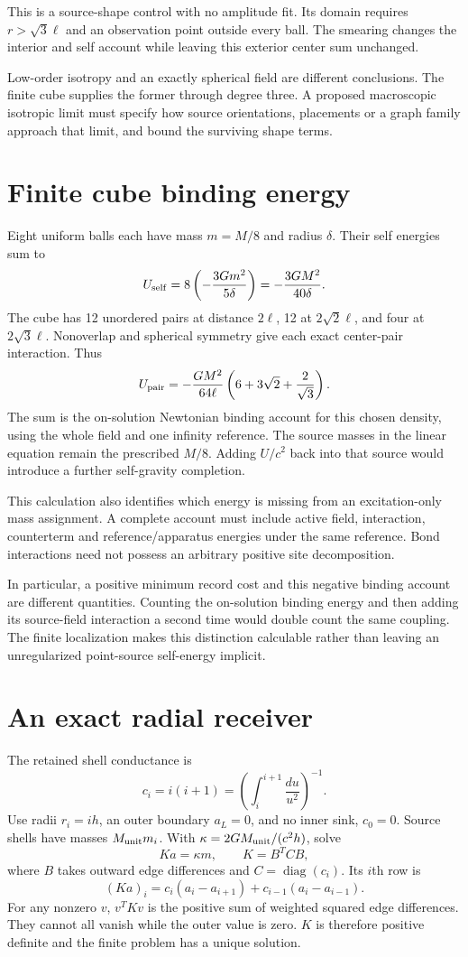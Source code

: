\documentclass[10pt,twocolumn,letterpaper]{article}
\begin{document}
This is a source-shape control with no amplitude fit. Its domain requires $r>\sqrt3\ell$ and an observation point outside every ball. The smearing changes the interior and self account while leaving this exterior center sum unchanged.

Low-order isotropy and an exactly spherical field are different conclusions. The finite cube supplies the former through degree three. A proposed macroscopic isotropic limit must specify how source orientations, placements or a graph family approach that limit, and bound the surviving shape terms.

\section{Finite cube binding energy}
Eight uniform balls each have mass $m=M/8$ and radius $\delta$. Their self energies sum to
\[
U_{\rm self}=8\left(-\frac{3Gm^2}{5\delta}\right)=-\frac{3GM^2}{40\delta}.
\]
The cube has 12 unordered pairs at distance $2\ell$, 12 at $2\sqrt2\ell$, and four at $2\sqrt3\ell$. Nonoverlap and spherical symmetry give each exact center-pair interaction. Thus
\[
U_{\rm pair}=-\frac{GM^2}{64\ell}\left(6+3\sqrt2+\frac2{\sqrt3}\right).
\]
The sum is the on-solution Newtonian binding account for this chosen density, using the whole field and one infinity reference. The source masses in the linear equation remain the prescribed $M/8$. Adding $U/c^2$ back into that source would introduce a further self-gravity completion.

This calculation also identifies which energy is missing from an excitation-only mass assignment. A complete account must include active field, interaction, counterterm and reference/apparatus energies under the same reference. Bond interactions need not possess an arbitrary positive site decomposition.

In particular, a positive minimum record cost and this negative binding account are different quantities. Counting the on-solution binding energy and then adding its source-field interaction a second time would double count the same coupling. The finite localization makes this distinction calculable rather than leaving an unregularized point-source self-energy implicit.

\section{An exact radial receiver}
The retained shell conductance is
\[
c_i=i(i+1)=\left(\int_i^{i+1}\frac{du}{u^2}\right)^{-1}.
\]
Use radii $r_i=ih$, an outer boundary $a_L=0$, and no inner sink, $c_0=0$. Source shells have masses $M_{\rm unit}m_i$. With $\kappa=2GM_{\rm unit}/(c^2h)$, solve
\[
Ka=\kappa m,\qquad K=B^TCB,
\]
where $B$ takes outward edge differences and $C=\operatorname{diag}(c_i)$. Its $i$th row is
\[
(Ka)_i=c_i(a_i-a_{i+1})+c_{i-1}(a_i-a_{i-1}).
\]
For any nonzero $v$, $v^TKv$ is the positive sum of weighted squared edge differences. They cannot all vanish while the outer value is zero. $K$ is therefore positive definite and the finite problem has a unique solution.
\end{document}
